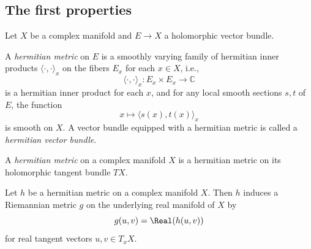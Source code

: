 
\subsection{The first properties}

    Let \(X\) be a complex manifold and \(E \to X\) a holomorphic vector bundle. 

    \begin{definition}\label{def:hermitian_metric_on_holomorphic_vector_bundles}
        A \emph{hermitian metric} on \(E\) is a smoothly varying family of hermitian inner products \(\langle \cdot, \cdot \rangle_x\) on the fibers \(E_x\) for each \(x \in X\),
        i.e., 
        \[\langle \cdot, \cdot \rangle_x: E_x \times E_x \to \mathbb{C}\]
        is a hermitian inner product for each \(x\), and for any local smooth sections \(s,t\) of \(E\), the function
        \[x \mapsto \langle s(x), t(x) \rangle_x\]
        is smooth on \(X\).
        A vector bundle equipped with a hermitian metric is called a \emph{hermitian vector bundle}.
    \end{definition}

    \begin{definition}\label{def:hermitian_metric_on_tangent_bundle}
        A \emph{hermitian metric} on a complex manifold \(X\) is a hermitian metric on its holomorphic tangent bundle \(TX\).
    \end{definition}

    \begin{remark}\label{rmk:Riemannian_metric_induced_by_hermitian_metric}
        Let \(h\) be a hermitian metric on a complex manifold \(X\).
        Then \(h\) induces a Riemannian metric \(g\) on the underlying real manifold of \(X\) by
        \[g(u,v) = \Real(h(u,v))\]
        for real tangent vectors \(u,v \in T_x X\).
    \end{remark}

